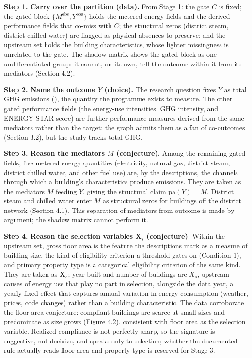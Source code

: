\textbf{Step 1. Carry over the partition (data).} From Stage 1: the gate $C$ is fixed; the gated block $\{M^{\text{obs}}, Y^{\text{obs}}\}$ holds the metered energy fields and the derived performance fields that co-miss with $C$; the structural zeros (district steam, district chilled water) are flagged as physical absences to preserve; and the upstream set holds the building characteristics, whose lighter missingness is unrelated to the gate. The shadow matrix shows the gated block as one undifferentiated group: it cannot, on its own, tell the outcome within it from its mediators (Section 4.2).

\textbf{Step 2. Name the outcome $Y$ (choice).} The research question fixes $Y$ as total GHG emissions (), the quantity the programme exists to measure. The other gated performance fields (the energy-use intensities, GHG intensity, and ENERGY STAR score) are further performance measures derived from the same mediators rather than the target; the graph admits them as a fan of co-outcomes (Section 3.2), but the study tracks total GHG.

\textbf{Step 3. Reason the mediators $M$ (conjecture).} Among the remaining gated fields, five metered energy quantities (electricity, natural gas, district steam, district chilled water, and other fuel use) are, by the descriptions, the channels through which a building's characteristics produce emissions. They are taken as the mediators $M$ feeding $Y$, giving the structural claim $\mathrm{pa}(Y) = M$. District steam and chilled water enter $M$ as structural zeros for buildings off the district network (Section 4.1). This separation of mediators from outcome is made by argument; the shadow matrix cannot perform it.

\textbf{Step 4. Reason the selection variables $\mathbf{X}_s$ (conjecture).} Within the upstream set, gross floor area is the feature the descriptions mark as a measure of building size, the kind of eligibility criterion a threshold gates on (Condition 1), and primary property type is a categorical eligibility criterion of the same kind. They are taken as $\mathbf{X}_s$; year built and number of buildings are $X_o$, upstream causes of energy use that play no part in selection, alongside the data year, a yearly fixed effect that captures annual variation in energy consumption (weather, prices, code changes) rather than a building characteristic. The data corroborate the floor-area conjecture: compliant buildings are scarce at small sizes and predominate as size grows (Figure 4.2), consistent with floor area as the selection variable. Realized compliance is not perfectly sharp, so the signature is suggestive, not decisive, and speaks only to selection; whether the documented rule actually reads floor area and property type is reserved for Stage 3.

